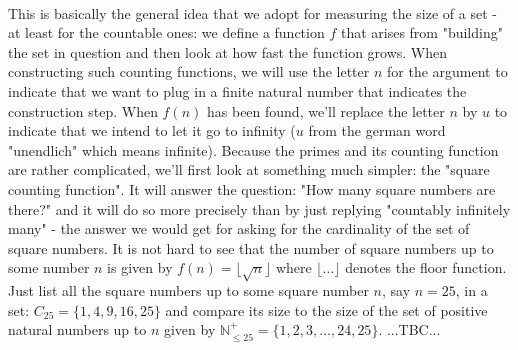\documentclass[12pt]{article}
\begin{document}
\paragraph{} This is basically the general idea that we adopt for measuring the size of a set - at least for the countable ones: we define a function $f$ that arises from "building" the set in question and then look at how fast the function grows. When constructing such counting functions, we will use the letter $n$ for the argument to indicate that we want to plug in a finite natural number that indicates the construction step. When $f(n)$ has been found, we'll replace the letter $n$ by $u$ to indicate that we intend to let it go to infinity ($u$ from the german word "unendlich" which means infinite). Because the primes and its counting function are rather complicated, we'll first look at something much simpler: the "square counting function". It will answer the question: "How many square numbers are there?" and it will do so more precisely than by just replying "countably infinitely many" - the answer we would get for asking for the cardinality of the set of square numbers. It is not hard to see that the number of square numbers up to some number $n$ is given by $f(n) = \lfloor \sqrt{n} \rfloor$ where $\lfloor \ldots \rfloor$ denotes the floor function. Just list all the square numbers up to some square number $n$, say $n=25$, in a set: $C_{25} = \{1,4,9,16,25\}$ and compare its size to the size of the set of positive natural numbers up to $n$ given by $\mathbb{N}^+_{\leq 25} = \{1,2,3,\ldots,24,25\}$. ...TBC... %
\end{document}
